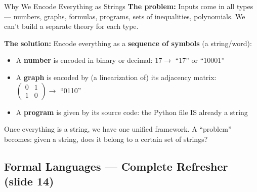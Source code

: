 \documentclass[11pt,a4paper]{article}
\begin{document}
\begin{conceptbox}{Why We Encode Everything as Strings}
\textbf{The problem:} Inputs come in all types --- numbers, graphs, formulas, programs, sets of inequalities, polynomials. We can't build a separate theory for each type.

\textbf{The solution:} Encode everything as a \textbf{sequence of symbols} (a string/word):
\begin{itemize}[nosep]
\item A \textbf{number} is encoded in binary or decimal: $17 \to$ ``17'' or ``10001''
\item A \textbf{graph} is encoded by (a linearization of) its adjacency matrix: $\begin{pmatrix} 0 & 1 \\ 1 & 0 \end{pmatrix} \to$ ``0110''
\item A \textbf{program} is given by its source code: the Python file IS already a string
\end{itemize}

Once everything is a string, we have one unified framework. A ``problem'' becomes: given a string, does it belong to a certain set of strings?
\end{conceptbox}

\subsection{Formal Languages --- Complete Refresher (slide 14)}
\end{document}
